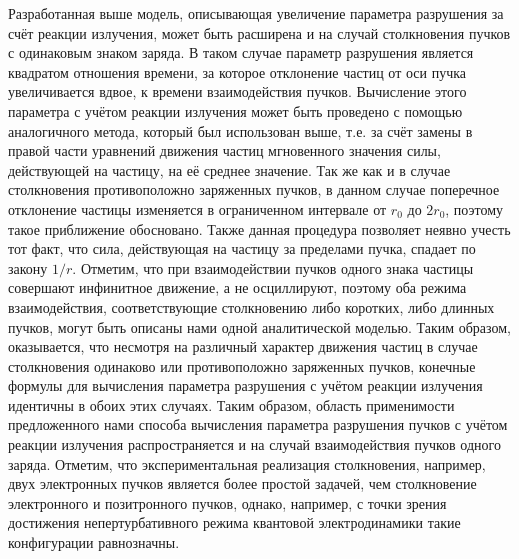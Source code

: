Разработанная выше модель, описывающая увеличение параметра разрушения за счёт реакции излучения, может быть расширена и на случай столкновения пучков с одинаковым знаком заряда.
В таком случае параметр разрушения является квадратом отношения времени, за которое отклонение частиц от оси пучка увеличивается вдвое, к времени взаимодействия пучков.
Вычисление этого параметра с учётом реакции излучения может быть проведено с помощью аналогичного метода, который был использован выше, т.е. за счёт замены в правой части уравнений движения частиц мгновенного значения силы, действующей на частицу, на её среднее значение.
Так же как и в случае столкновения противоположно заряженных пучков, в данном случае поперечное отклонение частицы изменяется в ограниченном интервале от $r_0$ до $2r_0$, поэтому такое приближение обосновано.
Также данная процедура позволяет неявно учесть тот факт, что сила, действующая на частицу за пределами пучка, спадает по закону $1/r$.
Отметим, что при взаимодействии пучков одного знака частицы совершают инфинитное движение, а не осциллируют, поэтому оба режима взаимодействия, соответствующие столкновению либо коротких, либо длинных пучков, могут быть описаны нами одной аналитической моделью.
Таким образом, оказывается, что несмотря на различный характер движения частиц в случае столкновения одинаково или противоположно заряженных пучков, конечные формулы для вычисления параметра разрушения с учётом реакции излучения идентичны в обоих этих случаях.
Таким образом, область применимости предложенного нами способа вычисления параметра разрушения пучков с учётом реакции излучения распространяется и на случай взаимодействия пучков одного заряда. Отметим, что экспериментальная реализация столкновения, например, двух электронных пучков является более простой задачей, чем столкновение электронного и позитронного пучков, однако, например, с точки зрения достижения непертурбативного режима квантовой электродинамики такие конфигурации равнозначны.

\paragraph{}

